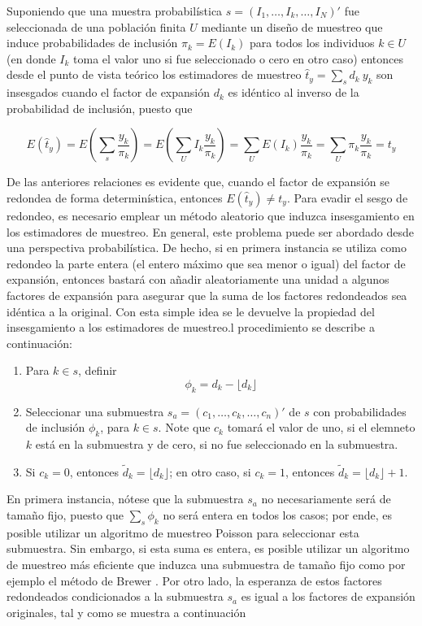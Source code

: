 \documentclass[
  12pt,
  spanish,
]{book}
\begin{document}
Suponiendo que una muestra probabilística \(s=(I_1,\ldots,I_k,\ldots,I_N)'\) fue seleccionada de una población finita \(U\) mediante un diseño de muestreo que induce probabilidades de inclusión \(\pi_k= E(I_k)\) para todos los individuos \(k \in U\) (en donde \(I_k\) toma el valor uno si fue seleccionado o cero en otro caso) entonces desde el punto de vista teórico los estimadores de muestreo \(\hat t_y = \sum_s d_k \ y_k\) son insesgados cuando el factor de expansión \(d_k\) es idéntico al inverso de la probabilidad de inclusión, puesto que

\[
E(\hat t_y)
= E \left( \sum_s \frac{y_k}{\pi_k} \right)
= E \left(\sum_U I_k \frac{y_k}{\pi_k} \right)
= \sum_U E(I_k)  \frac{y_k}{\pi_k}
= \sum_U \pi_k \frac{y_k}{\pi_k} = t_y
\]

De las anteriores relaciones es evidente que, cuando el factor de expansión se redondea de forma determinística, entonces \(E(\hat t_y) \neq t_y\). Para evadir el sesgo de redondeo, es necesario emplear un método aleatorio que induzca insesgamiento en los estimadores de muestreo. En general, este problema puede ser abordado desde una perspectiva probabilística. De hecho, si en primera instancia se utiliza como redondeo la parte entera (el entero máximo que sea menor o igual) del factor de expansión, entonces bastará con añadir aleatoriamente una unidad a algunos factores de expansión para asegurar que la suma de los factores redondeados sea idéntica a la original. Con esta simple idea se le devuelve la propiedad del insesgamiento a los estimadores de muestreo.l procedimiento se describe a continuación:

\begin{enumerate}
\def\labelenumi{\arabic{enumi}.}
\item
  Para \(k \in s\), definir
  \[\phi_k = d_k - \lfloor d_k \rfloor\]
\item
  Seleccionar una submuestra \(s_a=(c_1,\ldots,c_k,\ldots,c_n)'\) de \(s\) con probabilidades de inclusión \(\phi_k\), para \(k\in s\). Note que \(c_k\) tomará el valor de uno, si el elemneto \(k\) está en la submuestra y de cero, si no fue seleccionado en la submuestra.
\item
  Si \(c_k = 0\), entonces \(\tilde d_k = \lfloor d_k \rfloor\); en otro caso, si \(c_k = 1\), entonces \(\tilde d_k = \lfloor d_k \rfloor + 1\).
\end{enumerate}

En primera instancia, nótese que la submuestra \(s_a\) no necesariamente será de tamaño fijo, puesto que \(\sum_s\phi_k\) no será entera en todos los casos; por ende, es posible utilizar un algoritmo de muestreo Poisson \citep[sección 4.1]{Gutierrez_2016} para seleccionar esta submuestra. Sin embargo, si esta suma es entera, es posible utilizar un algoritmo de muestreo más eficiente que induzca una submuestra de tamaño fijo como por ejemplo el método de Brewer \citep{Tille2006}. Por otro lado, la esperanza de estos factores redondeados condicionados a la submuestra \(s_a\) es igual a los factores de expansión originales, tal y como se muestra a continuación
\end{document}
